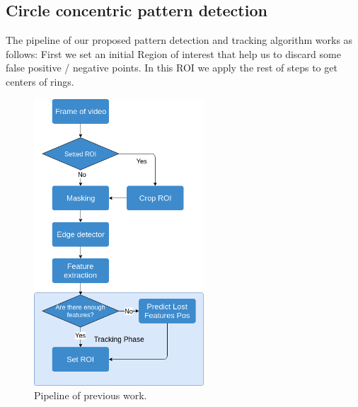\documentclass[journal]{IEEEtran}
\begin{document}
\subsection{Circle concentric pattern detection}
The pipeline of our proposed pattern detection and tracking algorithm works as follows: First we set an initial Region of interest that help us to discard some false positive / negative points. In this ROI we apply the rest of steps to get centers of rings.

\begin{figure}[H]
\centering
\includegraphics[width=2.5in]{_img/algorithm_overview.png}
\caption{Pipeline of previous work.}
\end{figure}
\end{document}
